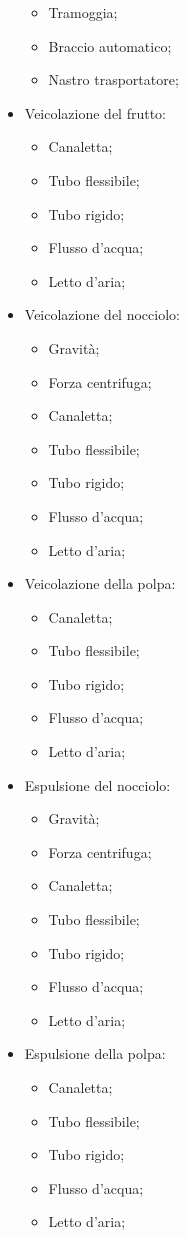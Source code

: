 \documentclass[12pt,a4paper,twoside]{report}  %
\begin{document}
\begin{itemize}
\begin{itemize}
  \item Tramoggia;
  \item Braccio automatico;
  \item Nastro trasportatore;
  \end{itemize}
\item Veicolazione del frutto:
  \begin{itemize}
  \item Canaletta;
  \item Tubo flessibile;
  \item Tubo rigido;
  \item Flusso d'acqua;
  \item Letto d'aria;
  \end{itemize}
\item Veicolazione del nocciolo:
  \begin{itemize}
  \item Gravità;
  \item Forza centrifuga;
  \item Canaletta;
  \item Tubo flessibile;
  \item Tubo rigido;
  \item Flusso d'acqua;
  \item Letto d'aria;
  \end{itemize}
\item Veicolazione della polpa:
  \begin{itemize}
  \item Canaletta;
  \item Tubo flessibile;
  \item Tubo rigido;
  \item Flusso d'acqua;
  \item Letto d'aria;
  \end{itemize}
\item Espulsione del nocciolo:
  \begin{itemize}
  \item Gravità;
  \item Forza centrifuga;
  \item Canaletta;
  \item Tubo flessibile;
  \item Tubo rigido;
  \item Flusso d'acqua;
  \item Letto d'aria;
  \end{itemize}
\item Espulsione della polpa:
  \begin{itemize}
  \item Canaletta;
  \item Tubo flessibile;
  \item Tubo rigido;
  \item Flusso d'acqua;
  \item Letto d'aria;
  \end{itemize}
\end{itemize}
\end{document}
